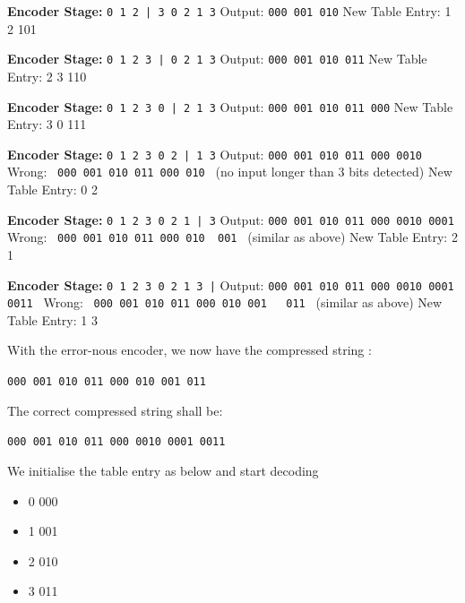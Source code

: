 \documentclass[12pt]{article}
\begin{document}
\textbf{Encoder Stage:} \texttt{0 1 2 | 3 0 2 1 3}
\newline Output: \texttt{000 001 010}
\newline New Table Entry: 1 2 \textrightarrow{} 101

\textbf{Encoder Stage:} \texttt{0 1 2 3 | 0 2 1 3}
\newline Output: \texttt{000 001 010 011}
\newline New Table Entry: 2 3 \textrightarrow{} 110

\textbf{Encoder Stage:} \texttt{0 1 2 3 0 | 2 1 3}
\newline Output: \texttt{000 001 010 011 000}
\newline New Table Entry: 3 0 \textrightarrow{} 111

\textbf{Encoder Stage:} \texttt{0 1 2 3 0 2 | 1 3}
\newline Output: \texttt{000 001 010 011 000 {\color{blue}0010} }
\newline Wrong: \ \texttt{000 001 010 011 000 {\color{red}010} } (no input longer than 3 bits detected)
\newline New Table Entry: 0 2 

\textbf{Encoder Stage:} \texttt{0 1 2 3 0 2 1 | 3}
\newline Output: \texttt{000 001 010 011 000 0010 {\color{blue}0001} }
\newline Wrong: \ \texttt{000 001 010 011 000 010 {\ \color{red}001} } (similar as above)
\newline New Table Entry: 2 1 

\textbf{Encoder Stage:} \texttt{0 1 2 3 0 2 1 3 |}
\newline Output: \texttt{000 001 010 011 000 0010 0001 {\color{blue}0011} }
\newline Wrong: \ \texttt{000 001 010 011 000 010 001  {\ \ \color{red}011} } (similar as above)
\newline New Table Entry: 1 3 

With the error-nous encoder, we now have the compressed string :

\texttt{\color{red}000 001 010 011 000 010 001 011}

The correct compressed string shall be:

\texttt{\color{blue}000 001 010 011 000 0010 0001 0011}

We initialise the table entry as below and start decoding
\begin{itemize}[topsep=0pt]\itemsep-0.6em 
    \item 0 \textrightarrow{}000
    \item 1 \textrightarrow{}001
    \item 2 \textrightarrow{}010
    \item 3 \textrightarrow{}011
\end{itemize}
\end{document}
